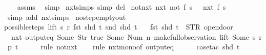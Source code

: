 \begin{isabellebody}
\ \ \isamarkupfalse%
\ assms\ \isamarkupfalse%
\ simp%
\endisatagproof
{\isafoldproof}%
%
\isadelimproof
\isanewline
%
\endisadelimproof
\isanewline
{}\isamarkupfalse%
\ nxt{\isachardot}simps\ {\isacharbrackleft}simp\ del{\isacharbrackright}\isanewline
\isanewline
{}\isamarkupfalse%
\ not{\isacharunderscore}nxt{\isacharcolon}\ {\isachardoublequoteopen}nxt\ {\isacharparenleft}not\ f{\isacharparenright}\ s\ {\isasymLongrightarrow}\ {\isasymnot}\ nxt\ f\ s{\isachardoublequoteclose}\isanewline
%
\isadelimproof
\ \ %
\endisadelimproof
%
\isatagproof
{}\isamarkupfalse%
\ {\isacharparenleft}simp\ add{\isacharcolon}\ nxt{\isachardot}simps{\isacharparenright}%
\endisatagproof
{\isafoldproof}%
%
\isadelimproof
\isanewline
%
\endisadelimproof
\isanewline
{}\isamarkupfalse%
\ no{\isacharunderscore}step{\isacharunderscore}empty{\isacharunderscore}out{\isacharcolon}\isanewline
{\isachardoublequoteopen}possible{\isacharunderscore}steps\ lift\ s\ r\ {\isacharparenleft}fst\ {\isacharparenleft}shd\ t{\isacharparenright}{\isacharparenright}\ {\isacharparenleft}snd\ {\isacharparenleft}shd\ t{\isacharparenright}{\isacharparenright}\ {\isacharequal}\ {\isacharbraceleft}{\isacharbar}{\isacharbar}{\isacharbraceright}\ {\isasymLongrightarrow}\isanewline
fst\ {\isacharparenleft}shd\ t{\isacharparenright}\ {\isacharequal}\ STR\ {\isacharprime}{\isacharprime}opendoor{\isacharprime}{\isacharprime}\ {\isasymLongrightarrow}\isanewline
\ {\isasymnot}\ nxt\ {\isacharparenleft}output{\isacharunderscore}eq\ {\isacharbrackleft}Some\ {\isacharparenleft}Str\ {\isacharprime}{\isacharprime}true{\isacharprime}{\isacharprime}{\isacharparenright}{\isacharcomma}\ Some\ {\isacharparenleft}Num\ n{\isacharparenright}{\isacharbrackright}{\isacharparenright}\ {\isacharparenleft}make{\isacharunderscore}full{\isacharunderscore}observation\ lift\ {\isacharparenleft}Some\ s{\isacharparenright}\ r\ p\ t{\isacharparenright}{\isachardoublequoteclose}\isanewline
%
\isadelimproof
\ \ \ \ %
\endisadelimproof
%
\isatagproof
{}\isamarkupfalse%
\ {\isacharparenleft}rule\ not{\isacharunderscore}nxt{\isacharparenright}\isanewline
\ \ \isamarkupfalse%
\ {\isacharparenleft}rule\ nxt{\isacharunderscore}mono{\isacharbrackleft}of\ {\isachardoublequoteopen}output{\isacharunderscore}eq\ {\isacharbrackleft}{\isacharbrackright}{\isachardoublequoteclose}{\isacharbrackright}{\isacharparenright}\isanewline
\ \ \ \isamarkupfalse%
\ {\isacharparenleft}case{\isacharunderscore}tac\ {\isachardoublequoteopen}shd\ t{\isachardoublequoteclose}{\isacharparenright}\isanewline

\end{isabellebody}
